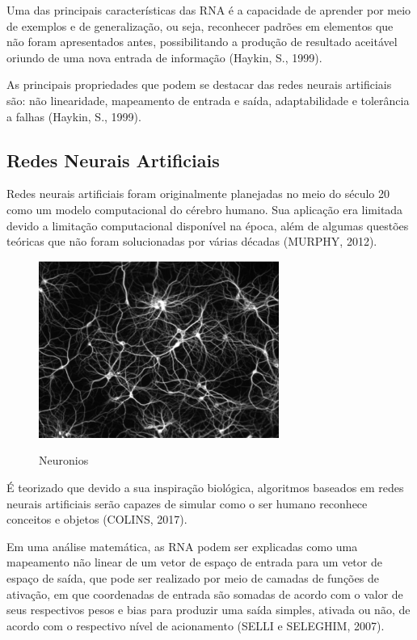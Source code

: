Uma das principais características das RNA é a capacidade de aprender por meio de exemplos e de generalização, ou seja, reconhecer padrões em elementos que não foram apresentados antes, possibilitando a produção de resultado aceitável oriundo de uma nova entrada de informação (Haykin, S., 1999).

As principais propriedades que podem se destacar das redes neurais artificiais são: não linearidade, mapeamento de entrada e saída, adaptabilidade e tolerância a falhas (Haykin, S., 1999).

\subsection{Redes Neurais Artificiais}

Redes neurais artificiais foram originalmente planejadas no meio do século 20 como um modelo computacional do cérebro humano. Sua aplicação era limitada devido a limitação computacional disponível na época, além de algumas questões teóricas que não foram solucionadas por várias décadas (MURPHY, 2012).

\begin{figure}
    \caption{Neuronios}
    \centering
    \includegraphics[width=0.7\textwidth]{Textuais/Figuras/neuronios.png}
    \label{fig:neuronios}
\end{figure}

É teorizado que devido a sua inspiração biológica, algoritmos baseados em redes neurais artificiais serão capazes de simular como o ser humano reconhece conceitos e objetos (COLINS, 2017).

Em uma análise matemática, as RNA podem ser explicadas como uma mapeamento não linear de um vetor de espaço de entrada para um vetor de espaço de saída, que pode ser realizado por meio de camadas de funções de ativação, em que coordenadas de entrada são somadas de acordo com o valor de seus respectivos pesos e bias  para produzir uma saída simples, ativada ou não, de acordo com o respectivo nível de acionamento (SELLI e SELEGHIM, 2007).

